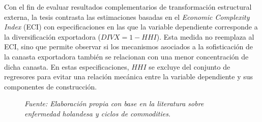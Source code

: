 \documentclass[../../PTFM.tex]{subfiles}
\begin{document}
	Con el fin de evaluar resultados complementarios de transformación estructural externa, la tesis contrasta las estimaciones basadas en el \textit{Economic Complexity Index} (ECI) con especificaciones en las que la variable dependiente corresponde a la diversificación exportadora ($DIVX=1-HHI$). Esta medida no reemplaza al ECI, sino que permite observar si los mecanismos asociados a la sofisticación de la canasta exportadora también se relacionan con una menor concentración de dicha canasta. En estas especificaciones, $HHI$ se excluye del conjunto de regresores para evitar una relación mecánica entre la variable dependiente y sus componentes de construcción.

	\begin{figure}[H]
		\centering
		\caption[Mecanismo boom y ajuste post-boom]{Esquema conceptual del mecanismo de boom de commodities y el proceso de ajuste posterior sobre actividades transables y transformación estructural externa.}

		\label{fig:esquema_boom_postboom_vertical}
		\caption*{\footnotesize \textit{Fuente: Elaboración propia con base en la literatura sobre enfermedad holandesa y ciclos de commodities.}}
	\end{figure}
\end{document}
